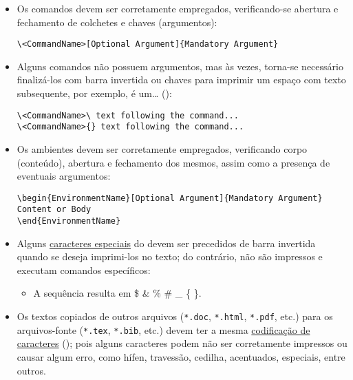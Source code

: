 \begin{itemize}
\item Os comandos devem ser corretamente empregados, verificando-se abertura e fechamento de colchetes e chaves (argumentos):
\begin{snugshade}
\begin{Verbatim}
\<CommandName>[Optional Argument]{Mandatory Argument}
\end{Verbatim}
\end{snugshade}
\item Alguns comandos não possuem argumentos, mas às vezes, torna-se necessário finalizá-los com barra invertida ou chaves para imprimir um espaço com texto subsequente, por exemplo,  é um\ldots{} ():
\begin{snugshade}
\begin{Verbatim}
\<CommandName>\ text following the command...
\<CommandName>{} text following the command...
\end{Verbatim}
\end{snugshade}
\item Os ambientes devem ser corretamente empregados, verificando corpo (conteúdo), abertura e fechamento dos mesmos, assim como a presença de eventuais argumentos:
\begin{snugshade}
\begin{Verbatim}
\begin{EnvironmentName}[Optional Argument]{Mandatory Argument}
Content or Body
\end{EnvironmentName}
\end{Verbatim}
\end{snugshade}
\item Alguns \href{https://en.wikibooks.org/wiki/LaTeX/Special_Characters}{caracteres especiais\LinkIcon} do  devem ser precedidos de barra invertida quando se deseja imprimi-los no texto; do contrário, não são impressos e executam comandos específicos:
\begin{itemize}
\item A sequência  resulta em \$ \& \% \# \_ \{ \}.
\end{itemize}
\item Os textos copiados de outros arquivos (\texttt{*.doc}, \texttt{*.html}, \texttt{*.pdf}, etc.) para os arquivos-fonte (\texttt{*.tex}, \texttt{*.bib}, etc.) devem ter a mesma \href{https://en.wikibooks.org/wiki/LaTeX/Special_Characters}{codificação de caracteres\LinkIcon} (); pois alguns caracteres podem não ser corretamente impressos ou causar algum erro, como hífen, travessão, cedilha, acentuados, especiais, entre outros.

\end{itemize}
